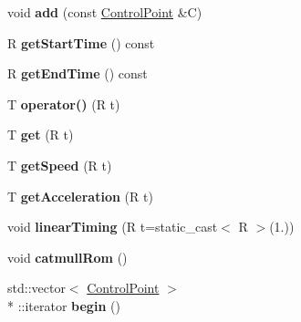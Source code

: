 \begin{DoxyCompactItemize}
\item 
\hypertarget{class_cubic_spline_acdf11d783a0dd7617a102da6eed6f2f7}{void {\bfseries add} (const \hyperlink{class_cubic_spline_1_1_control_point}{Control\+Point} \&C)}\label{class_cubic_spline_acdf11d783a0dd7617a102da6eed6f2f7}

\item 
\hypertarget{class_cubic_spline_ae588b1125265af223147542c2ea4a321}{R {\bfseries get\+Start\+Time} () const }\label{class_cubic_spline_ae588b1125265af223147542c2ea4a321}

\item 
\hypertarget{class_cubic_spline_a42c5272bdcc5e87703ae92f09f84d6ee}{R {\bfseries get\+End\+Time} () const }\label{class_cubic_spline_a42c5272bdcc5e87703ae92f09f84d6ee}

\item 
\hypertarget{class_cubic_spline_ac9e8435d327ccae34a5669ab521c89ab}{T {\bfseries operator()} (R t)}\label{class_cubic_spline_ac9e8435d327ccae34a5669ab521c89ab}

\item 
\hypertarget{class_cubic_spline_a9b3b37f8854ccb600a86143037968185}{T {\bfseries get} (R t)}\label{class_cubic_spline_a9b3b37f8854ccb600a86143037968185}

\item 
\hypertarget{class_cubic_spline_abbc03595baa0e3bbc6d9323156b036b6}{T {\bfseries get\+Speed} (R t)}\label{class_cubic_spline_abbc03595baa0e3bbc6d9323156b036b6}

\item 
\hypertarget{class_cubic_spline_aa90bb69636898cae50fa444178a1bb21}{T {\bfseries get\+Acceleration} (R t)}\label{class_cubic_spline_aa90bb69636898cae50fa444178a1bb21}

\item 
\hypertarget{class_cubic_spline_a721c7701df60b26a29ad0a8a161670a9}{void {\bfseries linear\+Timing} (R t=static\+\_\+cast$<$ R $>$(1.))}\label{class_cubic_spline_a721c7701df60b26a29ad0a8a161670a9}

\item 
\hypertarget{class_cubic_spline_a7a7893b6a340d6d92d2f485050a8a177}{void {\bfseries catmull\+Rom} ()}\label{class_cubic_spline_a7a7893b6a340d6d92d2f485050a8a177}

\item 
\hypertarget{class_cubic_spline_a33beb7f9777ad224b90724d897a785d7}{std\+::vector$<$ \hyperlink{class_cubic_spline_1_1_control_point}{Control\+Point} $>$\\*
\+::iterator {\bfseries begin} ()}\label{class_cubic_spline_a33beb7f9777ad224b90724d897a785d7}


\end{DoxyCompactItemize}
